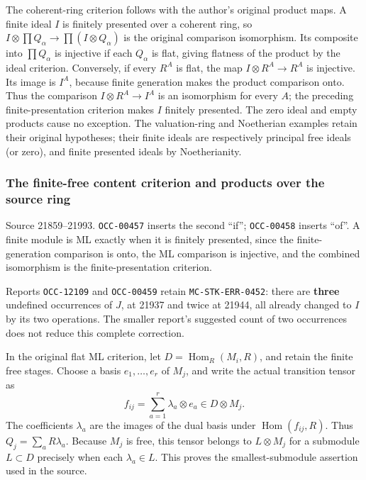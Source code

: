 The coherent-ring criterion follows with the author's original product maps. A finite ideal \(I\) is finitely presented over a coherent ring, so \(I\otimes\prod Q_\alpha\to\prod(I\otimes Q_\alpha)\) is the original comparison isomorphism. Its composite into \(\prod Q_\alpha\) is injective if each \(Q_\alpha\) is flat, giving flatness of the product by the ideal criterion. Conversely, if every \(R^A\) is flat, the map \(I\otimes R^A\to R^A\) is injective. Its image is \(I^A\), because finite generation makes the product comparison onto. Thus the comparison \(I\otimes R^A\to I^A\) is an isomorphism for every \(A\); the preceding finite-presentation criterion makes \(I\) finitely presented. The zero ideal and empty products cause no exception. The valuation-ring and Noetherian examples retain their original hypotheses; their finite ideals are respectively principal free ideals (or zero), and finite presented ideals by Noetherianity.

\subsubsection{The finite-free content criterion and products over the source ring}\label{the-finite-free-content-criterion-and-products-over-the-source-ring}

Source 21859--21993. \texttt{OCC-00457} inserts the second ``if''; \texttt{OCC-00458} inserts ``of''. A finite module is ML exactly when it is finitely presented, since the finite-generation comparison is onto, the ML comparison is injective, and the combined isomorphism is the finite-presentation criterion.

Reports \texttt{OCC-12109} and \texttt{OCC-00459} retain \texttt{MC-STK-ERR-0452}: there are \textbf{three} undefined occurrences of \(J\), at 21937 and twice at 21944, all already changed to \(I\) by its two operations. The smaller report's suggested count of two occurrences does not reduce this complete correction.

In the original flat ML criterion, let \(D=\operatorname{Hom}_R(M_i,R)\), and retain the finite free stages. Choose a basis \(e_1,\ldots,e_r\) of \(M_j\), and write the actual transition tensor as \[
f_{ij}=\sum_{a=1}^r \lambda_a\otimes e_a\in D\otimes M_j.
\] The coefficients \(\lambda_a\) are the images of the dual basis under \(\operatorname{Hom}(f_{ij},R)\). Thus \(Q_j=\sum_aR\lambda_a\). Because \(M_j\) is free, this tensor belongs to \(L\otimes M_j\) for a submodule \(L\subset D\) precisely when each \(\lambda_a\in L\). This proves the smallest-submodule assertion used in the source.

